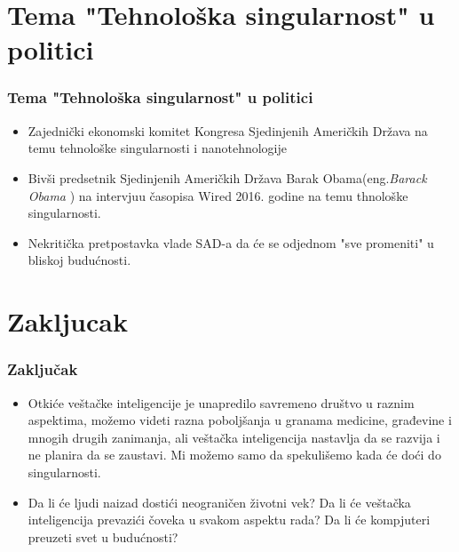 \documentclass{beamer}
\begin{document}
\section{Tema "Tehnološka singularnost" u politici}

\begin{frame}[fragile]\frametitle{Tema "Tehnološka singularnost" u politici}
	\begin{itemize}	
		\item Zajednički ekonomski komitet Kongresa Sjedinjenih Američkih Država na temu tehnološke singularnosti  i nanotehnologije
		\item Bivši predsetnik Sjedinjenih Američkih Država Barak Obama(eng.\textit{Barack Obama} ) na intervjuu časopisa Wired 2016. godine na temu thnološke singularnosti.
		\item Nekritička pretpostavka vlade SAD-a da će se odjednom "sve promeniti" u bliskoj budućnosti.
	\end{itemize}
\end{frame}

\section{Zakljucak}

\begin{frame}[fragile]\frametitle{Zaključak}
\begin{itemize}	
 \item Otkiće veštačke inteligencije je unapredilo savremeno društvo  u raznim aspektima, možemo videti razna poboljšanja u granama medicine, građevine i mnogih drugih zanimanja, ali veštačka inteligencija nastavlja da se razvija i ne planira da se zaustavi. Mi možemo samo da spekulišemo kada će doći do singularnosti.
\item Da li će ljudi naizad dostići neograničen životni vek? Da li će veštačka inteligencija prevazići čoveka u svakom aspektu rada? Da li će kompjuteri preuzeti svet u budućnosti?

\end{itemize}
\end{frame}
\end{document}
